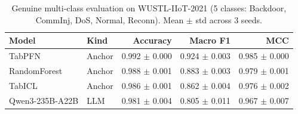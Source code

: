 \begin{table}[t]
\centering
\caption{Genuine multi-class evaluation on WUSTL-IIoT-2021 (5 classes: \textsf{Backdoor}, \textsf{CommInj}, \textsf{DoS}, \textsf{Normal}, \textsf{Reconn}). Mean $\pm$ std across 3 seeds.}
\label{tab:wustl-mc}
\small
\begin{tabular}{llrrr}
\toprule
Model & Kind & Accuracy & Macro F1 & MCC \\
\midrule
TabPFN & Anchor & 0.992 $\pm$ 0.000 & 0.924 $\pm$ 0.003 & 0.985 $\pm$ 0.000 \\
RandomForest & Anchor & 0.988 $\pm$ 0.001 & 0.883 $\pm$ 0.003 & 0.979 $\pm$ 0.001 \\
TabICL & Anchor & 0.986 $\pm$ 0.001 & 0.862 $\pm$ 0.004 & 0.976 $\pm$ 0.002 \\
Qwen3-235B-A22B & LLM & 0.981 $\pm$ 0.004 & 0.805 $\pm$ 0.011 & 0.967 $\pm$ 0.007 \\
\bottomrule
\end{tabular}
\end{table}
